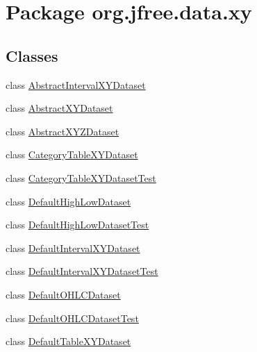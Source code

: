 \hypertarget{namespaceorg_1_1jfree_1_1data_1_1xy}{}\section{Package org.\+jfree.\+data.\+xy}
\label{namespaceorg_1_1jfree_1_1data_1_1xy}
\subsection*{Classes}
\begin{DoxyCompactItemize}
\item 
class \mbox{\hyperlink{classorg_1_1jfree_1_1data_1_1xy_1_1_abstract_interval_x_y_dataset}{Abstract\+Interval\+X\+Y\+Dataset}}
\item 
class \mbox{\hyperlink{classorg_1_1jfree_1_1data_1_1xy_1_1_abstract_x_y_dataset}{Abstract\+X\+Y\+Dataset}}
\item 
class \mbox{\hyperlink{classorg_1_1jfree_1_1data_1_1xy_1_1_abstract_x_y_z_dataset}{Abstract\+X\+Y\+Z\+Dataset}}
\item 
class \mbox{\hyperlink{classorg_1_1jfree_1_1data_1_1xy_1_1_category_table_x_y_dataset}{Category\+Table\+X\+Y\+Dataset}}
\item 
class \mbox{\hyperlink{classorg_1_1jfree_1_1data_1_1xy_1_1_category_table_x_y_dataset_test}{Category\+Table\+X\+Y\+Dataset\+Test}}
\item 
class \mbox{\hyperlink{classorg_1_1jfree_1_1data_1_1xy_1_1_default_high_low_dataset}{Default\+High\+Low\+Dataset}}
\item 
class \mbox{\hyperlink{classorg_1_1jfree_1_1data_1_1xy_1_1_default_high_low_dataset_test}{Default\+High\+Low\+Dataset\+Test}}
\item 
class \mbox{\hyperlink{classorg_1_1jfree_1_1data_1_1xy_1_1_default_interval_x_y_dataset}{Default\+Interval\+X\+Y\+Dataset}}
\item 
class \mbox{\hyperlink{classorg_1_1jfree_1_1data_1_1xy_1_1_default_interval_x_y_dataset_test}{Default\+Interval\+X\+Y\+Dataset\+Test}}
\item 
class \mbox{\hyperlink{classorg_1_1jfree_1_1data_1_1xy_1_1_default_o_h_l_c_dataset}{Default\+O\+H\+L\+C\+Dataset}}
\item 
class \mbox{\hyperlink{classorg_1_1jfree_1_1data_1_1xy_1_1_default_o_h_l_c_dataset_test}{Default\+O\+H\+L\+C\+Dataset\+Test}}
\item 
class \mbox{\hyperlink{classorg_1_1jfree_1_1data_1_1xy_1_1_default_table_x_y_dataset}{Default\+Table\+X\+Y\+Dataset}}

\end{DoxyCompactItemize}

